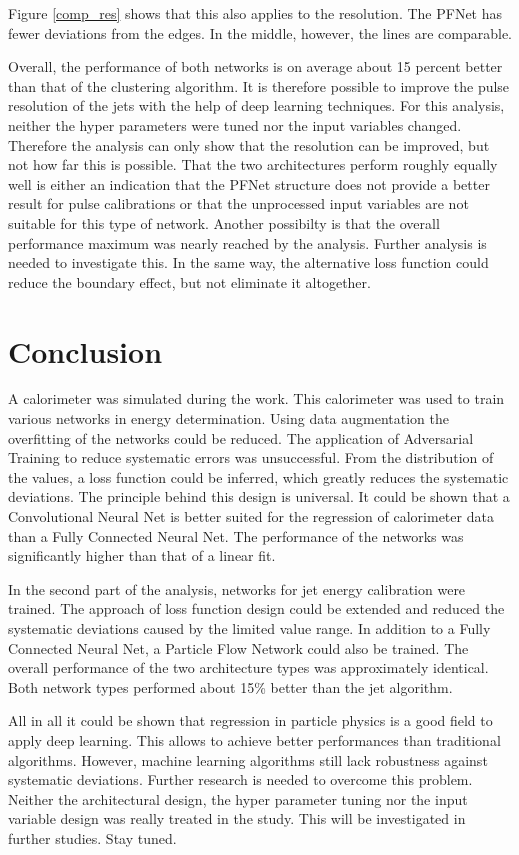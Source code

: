 \documentclass[12pt, a4paper]{thesis}
\begin{document}
Figure \ref{comp_res} shows that this also applies to the
resolution. The PFNet has fewer deviations from the edges. In the
middle, however, the lines are comparable.

Overall, the performance of both networks is on average about 15
percent better than that of the clustering algorithm.  It is therefore
possible to improve the pulse resolution of the jets with the help of
deep learning techniques.  For this analysis, neither the hyper
parameters were tuned nor the input variables changed. Therefore the
analysis can only show that the resolution can be improved, but not
how far this is possible. That the two architectures perform roughly
equally well is either an indication that the PFNet structure does not
provide a better result for pulse calibrations or that the unprocessed
input variables are not suitable for this type of network. Another
possibilty is that the overall performance maximum was nearly reached
by the analysis. Further analysis is needed to investigate this.  In
the same way, the alternative loss function could reduce the boundary
effect, but not eliminate it altogether.

\chapter{Conclusion}
\label{sec:org62a45ca}

A calorimeter was simulated during the work. This calorimeter was used
to  train  various  networks   in  energy  determination.  Using  data
augmentation the  overfitting of  the networks  could be  reduced. The
application of  Adversarial Training  to reduce systematic  errors was
unsuccessful.  From  the distribution of  the values, a  loss function
could   be   inferred,   which    greatly   reduces   the   systematic
deviations. The principle behind this design is universal. It could be
shown  that  a Convolutional  Neural  Net  is  better suited  for  the
regression of calorimeter data than  a Fully Connected Neural Net. The
performance of  the networks was  significantly higher than that  of a
linear fit.

In the second part of the analysis, networks for jet energy
calibration were trained.  The approach of loss function design could
be extended and reduced the systematic deviations caused by the
limited value range. In addition to a Fully Connected Neural Net, a
Particle Flow Network could also be trained. The overall performance
of the two architecture types was approximately identical. Both
network types performed about 15\% better than the jet algorithm.

All in all it could be shown that regression in particle physics is a
good field to apply deep learning. This allows to achieve better
performances than traditional algorithms. However, machine learning
algorithms still lack robustness against systematic
deviations. Further research is needed to overcome this
problem. Neither the architectural design, the hyper parameter tuning
nor the input variable design was really treated in the study. This
will be investigated in further studies. Stay tuned.


\appendix
\cleardoublepage



\end{document}
